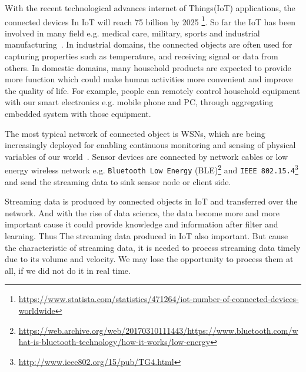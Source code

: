 



With the recent technological advances internet of Things(IoT) applications, the
connected devices In IoT will reach 75 billion by 2025
\footnote{\url{https://www.statista.com/statistics/471264/iot-number-of-connected-devices-worldwide}}. 
So far the IoT has been involved in many field e.g. medical care, military,
sports and industrial manufacturing~\cite{boudargham2017exhaustive,
lai2013survey, da2014internet}. In industrial domains, the connected objects are
often used for capturing properties such as temperature, and receiving signal or
data from others. In domestic domains, many household products are expected to
provide more function which could make human activities more convenient and
improve the quality of life. For example, people can remotely control household
equipment with our smart electronics e.g. mobile phone and PC, through
aggregating embedded system with those equipment. 

The most typical network of connected object is WSNs, which are being
increasingly deployed for enabling continuous monitoring and sensing of physical
variables of our world~\cite{li2016temporal}. Sensor devices are connected by
network cables or low energy wireless network e.g. \texttt{Bluetooth Low Energy}
(BLE)\footnote{\url{https://web.archive.org/web/20170310111443/https://www.bluetooth.com/what-is-bluetooth-technology/how-it-works/low-energy}}
and \texttt{IEEE 802.15.4}\footnote{\url{http://www.ieee802.org/15/pub/TG4.html}}
and send the streaming data to sink sensor node or client side.



Streaming data is produced by connected objects in IoT and transferred over the
network.  And with the rise of data science, the data become more and more
important cause it could provide knowledge and information after filter and
learning. Thus The streaming data produced in IoT also important. But cause the
characteristic of streaming data, it is needed to process streaming data timely
due to its volume and velocity. We may lose the opportunity to process them at
all, if we did not do it in real time.

